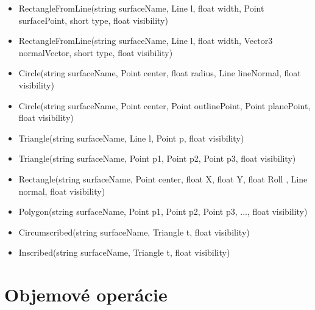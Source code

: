 \begin{itemize}

	\item RectangleFromLine(string surfaceName, Line l, float width, Point surfacePoint, short type, float visibility)
	
	\item RectangleFromLine(string surfaceName, Line l, float width, Vector3 normalVector, short type, float visibility)

	\item Circle(string surfaceName, Point center, float radius, Line lineNormal, float visibility)
	
	\item Circle(string surfaceName, Point center, Point outlinePoint, Point planePoint, float visibility)

	\item Triangle(string surfaceName, Line l, Point p, float visibility)
	
	\item Triangle(string surfaceName, Point p1, Point p2, Point p3, float visibility)


	\item Rectangle(string surfaceName, Point center, float X, float Y, float Roll
    , Line normal, float visibility)

	\item Polygon(string surfaceName, Point p1, Point p2, Point p3, ..., float visibility)


	\item Circumscribed(string surfaceName, Triangle t, float visibility) 
	
	\item Inscribed(string surfaceName, Triangle t, float visibility)		
	
\end{itemize}
\section{Objemové operácie}

